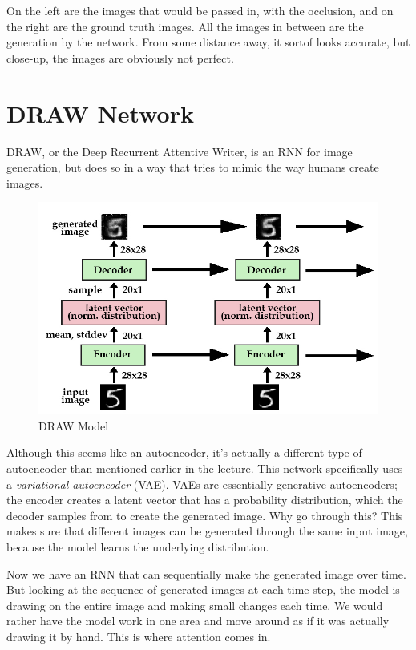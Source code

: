 \documentclass{article}
\begin{document}
On the left are the images that would be passed in, with the occlusion, and on the right are the ground truth images. All the images in between are the generation by the network. From some distance away, it sortof looks accurate, but close-up, the images are obviously not perfect.

\section{DRAW Network}

DRAW, or the Deep Recurrent Attentive Writer, is an RNN for image generation, but does so in a way that tries to mimic the way humans create images.

\begin{figure}[H]
\centering
\includegraphics[scale=.35]{draw_structure.jpg}
\caption{DRAW Model}
\label{fig:draw_structure}
\end{figure}

Although this seems like an autoencoder, it's actually a different type of autoencoder than mentioned earlier in the lecture. This network specifically uses a \textit{variational autoencoder} (VAE). VAEs are essentially generative autoencoders; the encoder creates a latent vector that has a probability distribution, which the decoder samples from to create the generated image. Why go through this? This makes sure that different images can be generated through the same input image, because the model learns the underlying distribution.

Now we have an RNN that can sequentially make the generated image over time. But looking at the sequence of generated images at each time step, the model is drawing on the entire image and making small changes each time. We would rather have the model work in one area and move around as if it was actually drawing it by hand. This is where attention comes in.
\end{document}
